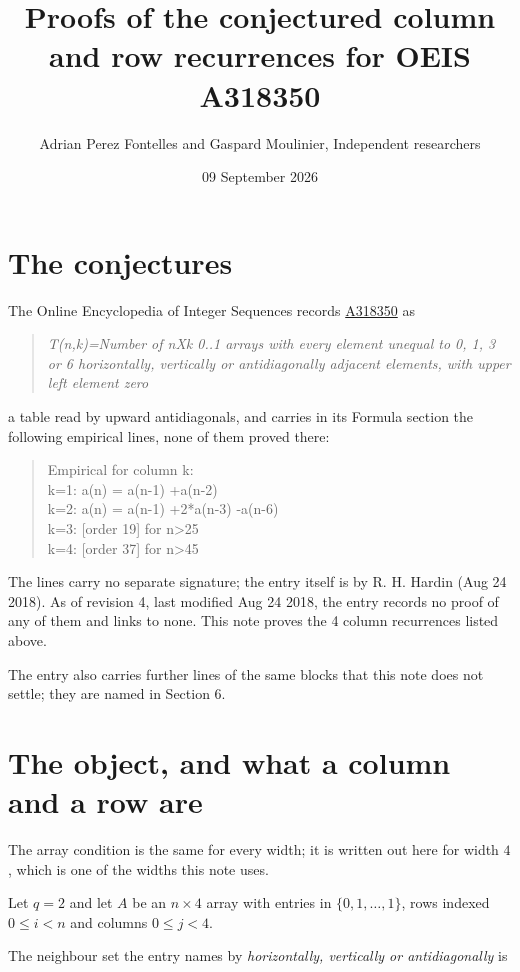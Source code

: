 \documentclass[11pt]{article}
\title{Proofs of the conjectured column and row recurrences for OEIS A318350}
\author{Adrian Perez Fontelles and Gaspard Moulinier, Independent researchers}
\date{09 September 2026}
\theoremstyle{definition}
\begin{document}
\maketitle
\section{The conjectures}

The Online Encyclopedia of Integer Sequences records \href{https://oeis.org/A318350}{A318350} as

\begin{quote}\itshape T(n,k)=Number of nXk 0..1 arrays with every element unequal to 0, 1, 3 or 6 horizontally, vertically or antidiagonally adjacent elements, with upper left element zero\end{quote}

a table read by upward antidiagonals, and carries in its Formula section the following empirical lines, none of them proved there:

\begin{quote}\ttfamily Empirical for column k:\\
k=1: a(n) = a(n-1) +a(n-2)\\k=2: a(n) = a(n-1) +2*a(n-3) -a(n-6)\\k=3: [order 19] for n>25\\k=4: [order 37] for n>45\end{quote}

The lines carry no separate signature; the entry itself is by R. H. Hardin (Aug 24 2018). As of revision 4, last modified Aug 24 2018, the entry records no proof of any of them and links to none. This note proves the 4 column recurrences listed above.

The entry also carries further lines of the same blocks that this note does not settle; they are named in Section 6.

\section{The object, and what a column and a row are}

The array condition is the same for every width; it is written out here for width $4$, which is one of the widths this note uses.

Let $q = 2$ and let $A$ be an $n \times 4$ array with entries in $\{0,1,\dots,1\}$, rows indexed $0 \le i < n$ and columns $0 \le j < 4$.

The neighbour set the entry names by {\itshape horizontally, vertically or antidiagonally} is
\end{document}
